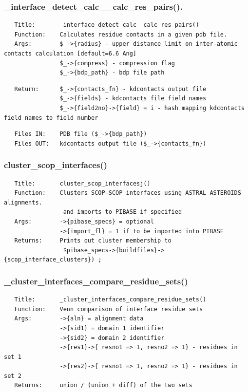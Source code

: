 \documentclass{article}
\begin{document}
\subsubsection*{\_interface\_detect\_calc\_\_calc\_res\_pairs().\label{pibase::calc::interfaces__interface_detect_calc_calc_res_pairs_}}
\begin{verbatim}
   Title:       _interface_detect_calc__calc_res_pairs()
   Function:    Calculates residue contacts in a given pdb file.
   Args:        $_->{radius} - upper distance limit on inter-atomic contacts calculation [default=6.6 Ang]
                $_->{compress} - compression flag
                $_->{bdp_path} - bdp file path
\end{verbatim}
\begin{verbatim}
   Return:      $_->{contacts_fn} - kdcontacts output file
                $_->{fields} - kdcontacts file field names
                $_->{field2no}->{field} = i - hash mapping kdcontacts field names to field number
\end{verbatim}
\begin{verbatim}
   Files IN:    PDB file ($_->{bdp_path})
   Files OUT:   kdcontacts output file ($_->{contacts_fn})
\end{verbatim}
\subsubsection*{cluster\_scop\_interfaces()\label{pibase::calc::interfaces_cluster_scop_interfaces_}}
\begin{verbatim}
   Title:       cluster_scop_interfacesj()
   Function:    Clusters SCOP-SCOP interfaces using ASTRAL ASTEROIDS alignments.
                 and imports to PIBASE if specified
   Args:        ->{pibase_specs} = optional
                ->{import_fl} = 1 if to be imported into PIBASE
   Returns:     Prints out cluster membership to
                 $pibase_specs->{buildfiles}->{scop_interface_clusters}) ;
\end{verbatim}
\subsubsection*{\_cluster\_interfaces\_compare\_residue\_sets()\label{pibase::calc::interfaces__cluster_interfaces_compare_residue_sets_}}
\begin{verbatim}
   Title:       _cluster_interfaces_compare_residue_sets()
   Function:    Venn comparison of interface residue sets 
   Args:        ->{aln} = alignment data
                ->{sid1} = domain 1 identifier
                ->{sid2} = domain 2 identifier
                ->{res1}->{ resno1 => 1, resno2 => 1} - residues in set 1
                ->{res2}->{ resno1 => 1, resno2 => 1} - residues in set 2
   Returns:     union / (union + diff) of the two sets
\end{verbatim}
\end{document}
